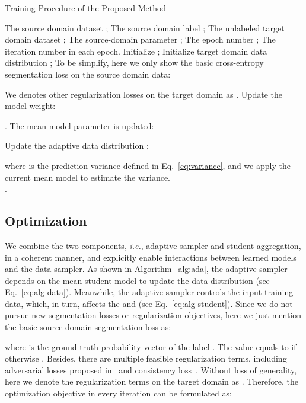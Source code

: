 \documentclass[journal]{IEEEtran}
\def\ie{\emph{i.e.}}
\begin{document}
\begin{algorithm}[t]
\small
\caption{Training Procedure of the Proposed Method}
\label{alg:ada}
\begin{algorithmic}[1]
\Require The source domain dataset ; The source domain label ; The unlabeled target domain dataset ; 
\Require The source-domain parameter ; The epoch number ; The iteration number  in each epoch.
\State Initialize ;
\State Initialize target domain data distribution ; 
\State  To be simplify, here we only show the basic cross-entropy segmentation loss on the source domain data: 

\State We denotes other regularization losses on the target domain as . Update the model weight:

\EndFor 
\State .
\State The mean model parameter is updated:

\State Update the adaptive data distribution :

where  is the prediction variance defined in Eq.~\ref{eq:variance}, and we apply the current mean model  to estimate the variance.  
\EndFor \\
\Return .
\end{algorithmic}
\end{algorithm}

\subsection{Optimization}
We combine the two components, \ie, adaptive sampler and student aggregation, in a coherent manner, and explicitly enable interactions between learned models and the data sampler. As shown in Algorithm~\ref{alg:ada}, the adaptive sampler depends on the mean student model  to update the data distribution (see Eq.~\ref{eq:alg-data}). Meanwhile, the adaptive sampler controls the input training data, which, in turn, affects the  and  (see Eq.~\ref{eq:alg-student}).  
Since we do not pursue new segmentation losses or regularization objectives, here we just mention the basic source-domain segmentation loss as: 

where  is the ground-truth probability vector of the label . The value  equals to  if  otherwise . Besides, there are multiple feasible regularization terms, including adversarial losses proposed in~\cite{tsai2018learning,luo2019significance} and consistency loss~\cite{zheng2019unsupervised}. Without loss of generality, here we denote the regularization terms on the target domain as . Therefore, the optimization objective in every iteration can be formulated as: 
\end{document}
